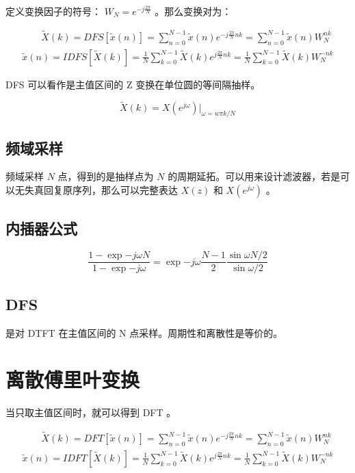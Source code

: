 \documentclass[cn,11pt,chinese,black,simple]{../elegantbook}
\begin{document}
定义变换因子的符号： \(W_N = e^{-j \frac{2\pi}{N}}\) 。那么变换对为：

$$
\begin{array}{l}
\qquad \tilde{X}(k)=D F S[\tilde{x}(n)]=\sum_{n=0}^{N-1} \tilde{x}(n) e^{-j \frac{2 \pi}{N} n k}=\sum_{n=0}^{N-1} \tilde{x}(n) W_{N}^{n k} \\
\tilde{x}(n)=I D F S[\tilde{X}(k)]=\frac{1}{N} \sum_{k=0}^{N-1} \tilde{X}(k) e^{j \frac{2 \pi}{N} n k}=\frac{1}{N} \sum_{k=0}^{N-1} \tilde{X}(k) W_{N}^{-n k}
\end{array}
$$

DFS 可以看作是主值区间的 Z 变换在单位圆的等间隔抽样。

\[\tilde{X}(k) = X(e^{j\omega}) | _{\omega = w\pi k / N}\]

\subsection{频域采样}

频域采样 \(N\) 点，得到的是抽样点为 \(N\) 的周期延拓。可以用来设计滤波器，若是可以无失真回复原序列，那么可以完整表达 \(X(z)\) 和 \(X(e^{j\omega})\) 。

\subsection{内插器公式}

\[\frac{1-\exp{-j\omega N}}{1-\exp{-j\omega}} = \exp{-j\omega\frac{N-1}{2}} \frac{\sin {\omega N / 2}}{\sin {\omega / 2}}\]

\subsection*{DFS}

是对 DTFT 在主值区间的 N 点采样。周期性和离散性是等价的。

\section{离散傅里叶变换}

当只取主值区间时，就可以得到 DFT 。

$$
\begin{array}{l}
\qquad \tilde{X}(k)=D F T[\tilde{x}(n)]=\sum_{n=0}^{N-1} \tilde{x}(n) e^{-j \frac{2 \pi}{N} n k}=\sum_{n=0}^{N-1} \tilde{x}(n) W_{N}^{n k} \\
\tilde{x}(n)=I D F T[\tilde{X}(k)]=\frac{1}{N} \sum_{k=0}^{N-1} \tilde{X}(k) e^{j \frac{2 \pi}{N} n k}=\frac{1}{N} \sum_{k=0}^{N-1} \tilde{X}(k) W_{N}^{-n k}
\end{array}
$$
\end{document}
